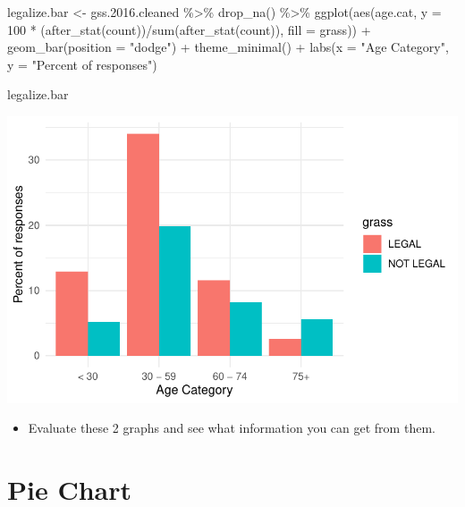 \documentclass[
  letterpaper,
  DIV=11,
  numbers=noendperiod]{scrreprt}
\newenvironment{Shaded}{\begin{snugshade}}{\end{snugshade}}
\newcommand{\AttributeTok}[1]{\textcolor[rgb]{0.40,0.45,0.13}{#1}}
\newcommand{\DecValTok}[1]{\textcolor[rgb]{0.68,0.00,0.00}{#1}}
\newcommand{\FloatTok}[1]{\textcolor[rgb]{0.68,0.00,0.00}{#1}}
\newcommand{\FunctionTok}[1]{\textcolor[rgb]{0.28,0.35,0.67}{#1}}
\newcommand{\NormalTok}[1]{\textcolor[rgb]{0.00,0.23,0.31}{#1}}
\newcommand{\OtherTok}[1]{\textcolor[rgb]{0.00,0.23,0.31}{#1}}
\newcommand{\SpecialCharTok}[1]{\textcolor[rgb]{0.37,0.37,0.37}{#1}}
\newcommand{\StringTok}[1]{\textcolor[rgb]{0.13,0.47,0.30}{#1}}
\providecommand{\tightlist}{%
  \setlength{\itemsep}{0pt}\setlength{\parskip}{0pt}}\usepackage{longtable,booktabs,array}
\begin{document}
\begin{Shaded}
\begin{Highlighting}[]
\NormalTok{legalize.bar }\OtherTok{\textless{}{-}}\NormalTok{ gss.}\FloatTok{2016.}\NormalTok{cleaned }\SpecialCharTok{\%\textgreater{}\%}
    \FunctionTok{drop\_na}\NormalTok{() }\SpecialCharTok{\%\textgreater{}\%}
    \FunctionTok{ggplot}\NormalTok{(}\FunctionTok{aes}\NormalTok{(age.cat, }\AttributeTok{y =} \DecValTok{100} \SpecialCharTok{*}\NormalTok{ (}\FunctionTok{after\_stat}\NormalTok{(count))}\SpecialCharTok{/}\FunctionTok{sum}\NormalTok{(}\FunctionTok{after\_stat}\NormalTok{(count)),}
        \AttributeTok{fill =}\NormalTok{ grass)) }\SpecialCharTok{+} \FunctionTok{geom\_bar}\NormalTok{(}\AttributeTok{position =} \StringTok{"dodge"}\NormalTok{) }\SpecialCharTok{+} \FunctionTok{theme\_minimal}\NormalTok{() }\SpecialCharTok{+}
    \FunctionTok{labs}\NormalTok{(}\AttributeTok{x =} \StringTok{"Age Category"}\NormalTok{, }\AttributeTok{y =} \StringTok{"Percent of responses"}\NormalTok{)}

\NormalTok{legalize.bar}
\end{Highlighting}
\end{Shaded}

\includegraphics{dataviz_files/figure-pdf/unnamed-chunk-16-1.pdf}

\begin{itemize}
\tightlist
\item
  Evaluate these 2 graphs and see what information you can get from
  them.
\end{itemize}

\section{Pie Chart}\label{pie-chart}
\end{document}
